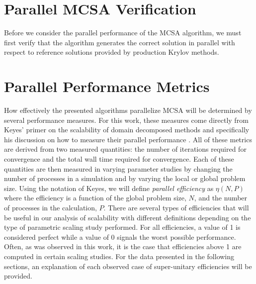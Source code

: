 \section{Parallel MCSA Verification\ }
\label{sec:parallel_verification}
Before we consider the parallel performance of the MCSA algorithm, we
must first verify that the algorithm generates the correct solution in
parallel with respect to reference solutions provided by production
Krylov methods.

\section{Parallel Performance Metrics\ }
\label{sec:parallel_performance_metrics}

How effectively the presented algorithms parallelize MCSA will be
determined by several performance measures. For this work, these
measures come directly from Keyes' primer on the scalability of domain
decomposed methods and specifically his discussion on how to measure
their parallel performance \citep{keyes_how_1999}. All of these
metrics are derived from two measured quantities: the number of
iterations required for convergence and the total wall time required
for convergence. Each of these quantities are then measured in varying
parameter studies by changing the number of processes in a simulation
and by varying the local or global problem size. Using the notation of
Keyes, we will define \textit{parallel efficiency} as $\eta(N,P)$
where the efficiency is a function of the global problem size, $N$,
and the number of processes in the calculation, $P$. There are several
types of efficiencies that will be useful in our analysis of
scalability with different definitions depending on the type of
parametric scaling study performed. For all efficiencies, a value of 1
is considered perfect while a value of 0 signals the worst possible
performance. Often, as was observed in this work, it is the case that
efficiencies above 1 are computed in certain scaling studies. For the
data presented in the following sections, an explanation of each
observed case of super-unitary efficiencies will be provided.

